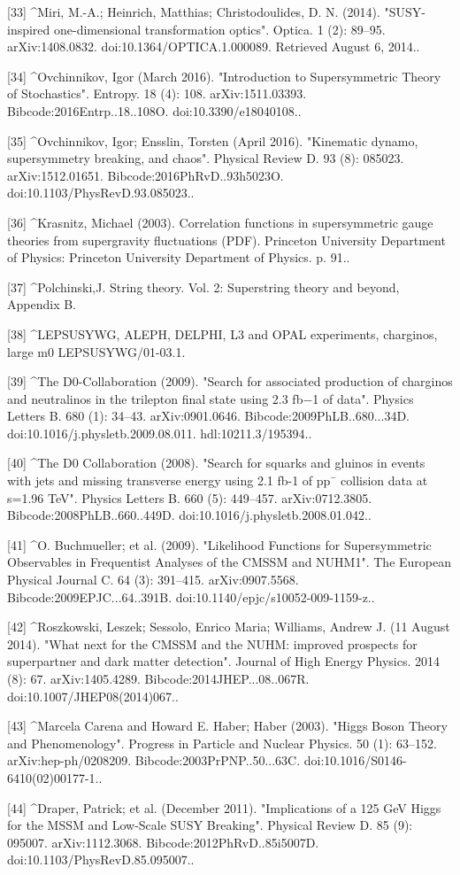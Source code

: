 [33]
^Miri, M.-A.; Heinrich, Matthias; Christodoulides, D. N. (2014). "SUSY-inspired one-dimensional transformation optics". Optica. 1 (2): 89–95. arXiv:1408.0832. doi:10.1364/OPTICA.1.000089. Retrieved August 6, 2014..

[34]
^Ovchinnikov, Igor (March 2016). "Introduction to Supersymmetric Theory of Stochastics". Entropy. 18 (4): 108. arXiv:1511.03393. Bibcode:2016Entrp..18..108O. doi:10.3390/e18040108..

[35]
^Ovchinnikov, Igor; Ensslin, Torsten (April 2016). "Kinematic dynamo, supersymmetry breaking, and chaos". Physical Review D. 93 (8): 085023. arXiv:1512.01651. Bibcode:2016PhRvD..93h5023O. doi:10.1103/PhysRevD.93.085023..

[36]
^Krasnitz, Michael (2003). Correlation functions in supersymmetric gauge theories from supergravity fluctuations (PDF). Princeton University Department of Physics: Princeton University Department of Physics. p. 91..

[37]
^Polchinski,J. String theory. Vol. 2: Superstring theory and beyond, Appendix B.

[38]
^LEPSUSYWG, ALEPH, DELPHI, L3 and OPAL experiments, charginos, large m0 LEPSUSYWG/01-03.1.

[39]
^The D0-Collaboration (2009). "Search for associated production of charginos and neutralinos in the trilepton final state using 2.3 fb−1 of data". Physics Letters B. 680 (1): 34–43. arXiv:0901.0646. Bibcode:2009PhLB..680...34D. doi:10.1016/j.physletb.2009.08.011. hdl:10211.3/195394..

[40]
^The D0 Collaboration (2008). "Search for squarks and gluinos in events with jets and missing transverse energy using 2.1 fb-1 of pp¯ collision data at s=1.96 TeV". Physics Letters B. 660 (5): 449–457. arXiv:0712.3805. Bibcode:2008PhLB..660..449D. doi:10.1016/j.physletb.2008.01.042..

[41]
^O. Buchmueller; et al. (2009). "Likelihood Functions for Supersymmetric Observables in Frequentist Analyses of the CMSSM and NUHM1". The European Physical Journal C. 64 (3): 391–415. arXiv:0907.5568. Bibcode:2009EPJC...64..391B. doi:10.1140/epjc/s10052-009-1159-z..

[42]
^Roszkowski, Leszek; Sessolo, Enrico Maria; Williams, Andrew J. (11 August 2014). "What next for the CMSSM and the NUHM: improved prospects for superpartner and dark matter detection". Journal of High Energy Physics. 2014 (8): 67. arXiv:1405.4289. Bibcode:2014JHEP...08..067R. doi:10.1007/JHEP08(2014)067..

[43]
^Marcela Carena and Howard E. Haber; Haber (2003). "Higgs Boson Theory and Phenomenology". Progress in Particle and Nuclear Physics. 50 (1): 63–152. arXiv:hep-ph/0208209. Bibcode:2003PrPNP..50...63C. doi:10.1016/S0146-6410(02)00177-1..

[44]
^Draper, Patrick; et al. (December 2011). "Implications of a 125 GeV Higgs for the MSSM and Low-Scale SUSY Breaking". Physical Review D. 85 (9): 095007. arXiv:1112.3068. Bibcode:2012PhRvD..85i5007D. doi:10.1103/PhysRevD.85.095007..
